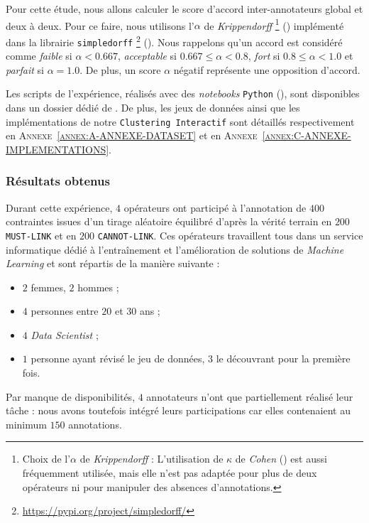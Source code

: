 			Pour cette étude, nous allons calculer le score d'accord inter-annotateurs global et deux à deux.
			Pour ce faire, nous utilisons l'$\alpha$ de \textit{Krippendorff} \footnote{
				Choix de l'$\alpha$ de \textit{Krippendorff} : L'utilisation de $\kappa$ de \textit{Cohen} (\cite{landis-koch:1977:measurement-observer-agreement}) est aussi fréquemment utilisée, mais elle n'est pas adaptée pour plus de deux opérateurs ni pour manipuler des absences d'annotations.
			} (\cite{krippendorff:2004:content-analysis-introduction}) implémenté dans la librairie \texttt{simpledorff} \footnote{
				\url{https://pypi.org/project/simpledorff/}
			} (\cite{perry:2021:lighttag-text-annotation}).
			Nous rappelons qu'un accord est considéré comme \textit{faible} si $\alpha<0.667$, \textit{acceptable} si $0.667 \leq \alpha<0.8$, \textit{fort} si $0.8 \leq \alpha<1.0$ et \textit{parfait} si $\alpha = 1.0$.
			De plus, un score $\alpha$ négatif représente une opposition d'accord.
			
			\begin{leftBarInformation}
				Les scripts de l'expérience, réalisés avec des \textit{notebooks} \texttt{Python} (\cite{van-rossum-drake:2009:python-reference-manual}), sont disponibles dans un dossier dédié de \cite{schild:2021:cognitivefactory-interactiveclusteringcomparativestudy}.
				De plus, les jeux de données ainsi que les implémentations de notre \texttt{Clustering Interactif} sont détaillés respectivement en \textsc{Annexe~\ref{annex:A-ANNEXE-DATASET}} et en \textsc{Annexe~\ref{annex:C-ANNEXE-IMPLEMENTATIONS}}.
			\end{leftBarInformation}
			
		\subsubsection{Résultats obtenus}
		
			Durant cette expérience, $4$ opérateurs ont participé à l'annotation de $400$ contraintes issues d'un tirage aléatoire équilibré d'après la vérité terrain en $200$ \texttt{MUST-LINK} et en $200$ \texttt{CANNOT-LINK}.
			Ces opérateurs travaillent tous dans un service informatique dédié à l'entraînement et l'amélioration de solutions de \textit{Machine Learning} et sont répartis de la manière suivante :
			\begin{itemize}
				\item $2$ femmes, $2$ hommes ;
				\item $4$ personnes entre $20$ et $30$ ans ;
				\item $4$ \textit{Data Scientist} ;
				\item $1$ personne ayant révisé le jeu de données, $3$ le découvrant pour la première fois.
			\end{itemize}
			Par manque de disponibilités, $4$ annotateurs n'ont que partiellement réalisé leur tâche : nous avons toutefois intégré leurs participations car elles contenaient au minimum $150$ annotations.
		
